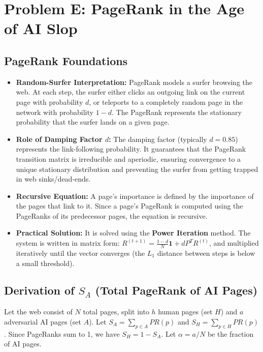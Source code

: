 \documentclass[11pt,a4paper]{article}
\begin{document}


\newpage

\section{Problem E: PageRank in the Age of AI Slop}

\subsection{PageRank Foundations}
\begin{itemize}
    \item \textbf{Random-Surfer Interpretation:} PageRank models a surfer browsing the web. At each step, the surfer either clicks an outgoing link on the current page with probability $d$, or teleports to a completely random page in the network with probability $1-d$. The PageRank represents the stationary probability that the surfer lands on a given page.
    \item \textbf{Role of Damping Factor $d$:} The damping factor (typically $d = 0.85$) represents the link-following probability. It guarantees that the PageRank transition matrix is irreducible and aperiodic, ensuring convergence to a unique stationary distribution and preventing the surfer from getting trapped in web sinks/dead-ends.
    \item \textbf{Recursive Equation:} A page's importance is defined by the importance of the pages that link to it. Since a page's PageRank is computed using the PageRanks of its predecessor pages, the equation is recursive.
    \item \textbf{Practical Solution:} It is solved using the \textbf{Power Iteration} method. The system is written in matrix form: $R^{(t+1)} = \frac{1-d}{N}\mathbf{1} + d P^T R^{(t)}$, and multiplied iteratively until the vector converges (the $L_1$ distance between steps is below a small threshold).
\end{itemize}

\subsection{Derivation of $S_A$ (Total PageRank of AI Pages)}
Let the web consist of $N$ total pages, split into $h$ human pages (set $H$) and $a$ adversarial AI pages (set $A$). Let $S_A = \sum_{p \in A} PR(p)$ and $S_H = \sum_{p \in H} PR(p)$. Since PageRanks sum to 1, we have $S_H = 1 - S_A$. Let $\alpha = a/N$ be the fraction of AI pages.
\end{document}
